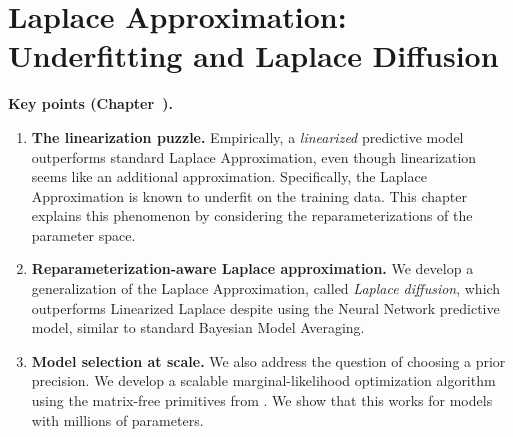 
\chapter{Laplace Approximation: Underfitting and Laplace Diffusion}
\label{ch:laplace}

\begin{keypointsbox}
\textbf{Key points (Chapter~\thechapter).}
\begin{enumerate}

    \item \textbf{The linearization puzzle.}
    Empirically, a \emph{linearized} predictive model outperforms standard Laplace Approximation, even though linearization seems like an additional approximation. Specifically, the Laplace Approximation is known to underfit on the training data. This chapter explains
    this phenomenon by considering the reparameterizations of the parameter space.

    \item \textbf{Reparameterization-aware Laplace approximation.}
    We develop a generalization of the Laplace Approximation, called \emph{Laplace diffusion}, which outperforms Linearized Laplace despite using the Neural Network predictive model, similar to standard Bayesian Model Averaging.

    \item \textbf{Model selection at scale.}
    We also address the question of choosing a prior precision. We develop a scalable marginal-likelihood optimization algorithm using the matrix-free primitives from . We show that this works for models with millions of parameters.
    \end{enumerate}
\end{keypointsbox}

